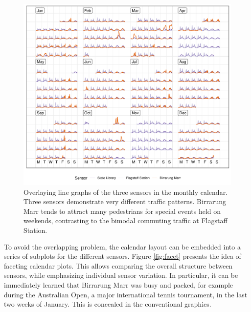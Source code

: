 \documentclass[12pt]{article}
\begin{document}
\begin{figure}

{\centering \includegraphics[width=\textwidth]{figure/overlay-1} 

}

\caption{Overlaying line graphs of the three sensors in the monthly calendar. Three sensors demonstrate very different traffic patterns. Birrarung Marr tends to attract many pedestrians for special events held on weekends, contrasting to the bimodal commuting traffic at Flagstaff Station.}\label{fig:overlay}
\end{figure}



To avoid the overlapping problem, the calendar layout can be embedded into a series of subplots for the different sensors. Figure \ref{fig:facet} presents the idea of faceting calendar plots. This allows comparing the overall structure between sensors, while emphasizing individual sensor variation. In particular, it can be immediately learned that Birrarung Marr was busy and packed, for example during the Australian Open, a major international tennis tournament, in the last two weeks of January. This is concealed in the conventional graphics.
\end{document}
